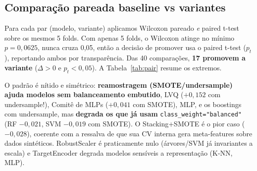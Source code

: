 \documentclass[12pt,a4paper]{article}
\begin{document}
\subsection{Comparação pareada baseline vs variantes}
Para cada par (modelo, variante) aplicamos Wilcoxon pareado \emph{e} paired t-test sobre os mesmos 5 folds. Com apenas 5 folds, o Wilcoxon atinge no mínimo $p=0{,}0625$, nunca cruza 0{,}05, então a decisão de promover usa o paired t-test ($p_t$), reportando ambos por transparência. Das 40 comparações, \textbf{17 promovem a variante} ($\Delta>0$ e $p_t<0{,}05$). A Tabela~\ref{tab:pair} resume os extremos.

O padrão é nítido e simétrico: \textbf{reamostragem (SMOTE/undersample) ajuda modelos sem balanceamento embutido}, LVQ ($+0{,}152$ com undersample!), Comitê de MLPs ($+0{,}041$ com SMOTE), MLP, e os boostings com undersample, mas \textbf{degrada os que já usam} \texttt{class\_weight="balanced"} (RF $-0{,}021$, SVM $-0{,}019$ com SMOTE). O Stacking+SMOTE é o pior caso ($-0{,}028$), coerente com a ressalva de que sua CV interna gera meta-features sobre dados sintéticos. RobustScaler é praticamente nulo (árvores/SVM já invariantes a escala) e TargetEncoder degrada modelos sensíveis a representação (K-NN, MLP).
\end{document}

